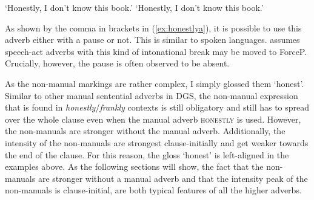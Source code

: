 \begin{exe}
\ex\label{ex:honestly}\begin{xlist}
\ex {} 
\glt `Honestly, I don't know this book.' \label{ex:honestlya}
\ex {}
\glt `Honestly, I don't know this book.' \label{ex:honestlyb}


\end{xlist}
\end{exe}

\noindent As shown by the comma in brackets in (\ref{ex:honestlya}), it is possible to use this adverb either with a pause or not. This is similar to spoken languages. \citet[84]{cinque1999adverbs} assumes speech-act adverbs with this kind of intonational break may be moved to ForceP. Crucially, however, the pause is often observed to be absent. 

As the non-manual markings are rather complex, I simply glossed them `honest'. Similar to other manual sentential adverbs in DGS, the non-manual expression that is found in \textit{honestly}/\textit{frankly} contexts is still obligatory and still has to spread over the whole clause even when the manual adverb \textsc{honestly} is used. However, the non-manuals are stronger without the manual adverb. Additionally, the intensity of the non-manuals are strongest clause-initially and get weaker towards the end of the clause. For this reason, the gloss `honest' is left-aligned in the examples above. As the following sections will show, the fact that the non-manuals are stronger without a manual adverb and that the intensity peak of the non-manuals is clause-initial, are both typical features of all the higher adverbs.

